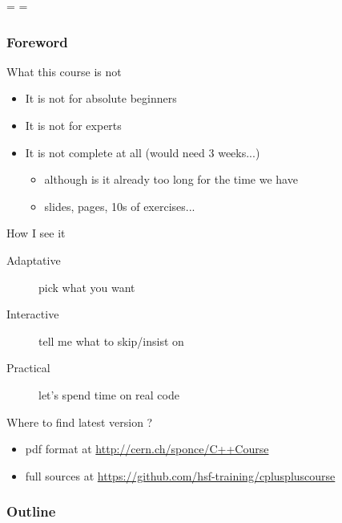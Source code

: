 \documentclass[compress]{beamer}
\begin{document}
\showboxdepth=\maxdimen
\showboxbreadth=\maxdimen

\begin{frame}
  \titlepage
\end{frame}

\begin{frame}
  \frametitle{Foreword}
  \begin{block}{What this course is not}
    \begin{itemize}
    \item It is not for absolute beginners
    \item It is not for experts
    \item It is not complete at all (would need 3 weeks...)
      \begin{itemize}
      \item although is it already too long for the time we have
      \item \inserttotalframenumber{} slides, \insertpresentationendpage{} pages, 10s of exercises...
      \end{itemize}
    \end{itemize}
  \end{block}
  \begin{block}{How I see it}
    \begin{description}
    \item[Adaptative] pick what you want
    \item[Interactive] tell me what to skip/insist on
    \item[Practical] let's spend time on real code
    \end{description}
  \end{block}
  \begin{block}{Where to find latest version ?}
    \begin{itemize}
    \item pdf format at {\small \color{blue} \url{http://cern.ch/sponce/C++Course}}
    \item full sources at {\scriptsize \color{blue} \url{https://github.com/hsf-training/cpluspluscourse}}
    \end{itemize}
  \end{block}
\end{frame}

\begin{frame}
  \frametitle{Outline}
  \begin{multicols}{2}
    \tableofcontents[sectionstyle=show,subsectionstyle=hide]
  \end{multicols}
\end{frame}
\end{document}
